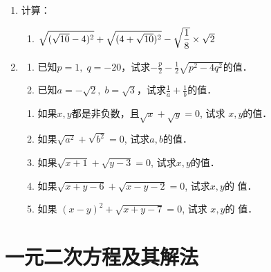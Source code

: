 \begin{enumerate}
\item 计算：

    \begin{enumerate}
    \item $\sqrt{(\sqrt{10}-4)^2}+\sqrt{(4+\sqrt{10})^2}-\sqrt{\dfrac{1}{8}}\times \sqrt{2}$
\end{enumerate}



\item \begin{enumerate}
    \item 已知$p=1, \; q=-20$，试求$-\frac{p}{2}-\frac{1}{2}\sqrt{p^2-4q^2}$的值．
    \item 已知$a=-\sqrt{2},\; b=\sqrt{3}$，试求$\frac{1}{a}+\frac{1}{b}$的值． 
\end{enumerate}

\begin{enumerate}
    \item 如果$x,y$都是非负数，且$\sqrt{x}+\sqrt{y}=0$, 试求
$x,y$的值．
\item 如果$\sqrt{a^2}+\sqrt{b^2}=0$, 试求$a,b$的值．
\item 如果$\sqrt{x+1}+\sqrt{y-3}=0$, 试求$x,y$的值．
\item 如果$\sqrt{x+y-6}+\sqrt{x-y-2}=0$, 试求$x,y$的
值．
\item 如果
$(x-y)^2+\sqrt{x+y-7}=0$, 试求 $x,y$的
值．
\end{enumerate}

\end{enumerate}

\section{一元二次方程及其解法}
